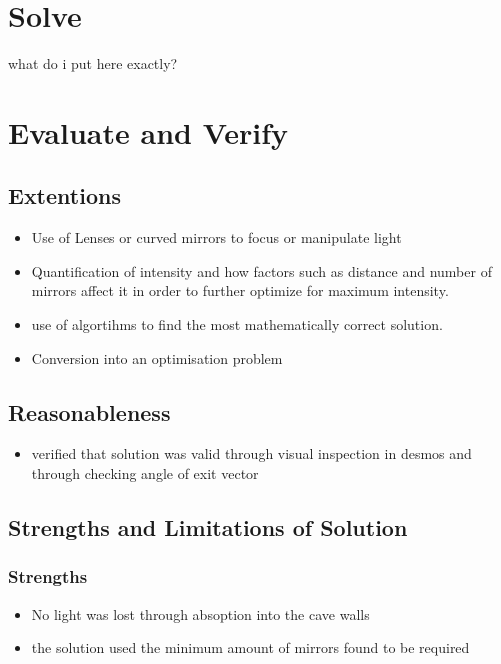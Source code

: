 \documentclass[11pt, letterpaper]{article}
\begin{document}
\par 


\section{Solve}

\par 
what do i put here exactly?

\section{Evaluate and Verify}



\subsection{Extentions}
\begin{itemize}
\item Use of Lenses	or curved mirrors to focus or manipulate light 
\item Quantification of intensity and how factors such as distance and number of mirrors affect it in order to further optimize for maximum intensity. 
\item use of algortihms to find the most mathematically correct solution.
\item Conversion into an optimisation problem
	
\end{itemize}



\subsection{Reasonableness}
\begin{itemize}
\item verified that solution was valid through visual inspection in desmos and through checking angle of exit vector
\end{itemize}

\subsection{Strengths and Limitations of Solution}
\subsubsection{Strengths}
\begin{itemize}
\item No light was lost through absoption into the cave walls
\item the solution used the minimum amount of mirrors found to be required
\end{itemize}
\end{document}
